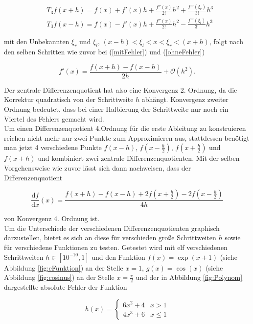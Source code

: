 \begin{align}
	&T_3f(x+h)= f(x) + f'(x)h +\frac{f''(x)}{2!}h^2 + \frac{f'''(\xi_r)}{3!}h^3
	\label{(x+h)}
	\\
	&T_3f(x-h)= f(x) - f'(x)h +\frac{f''(x)}{2!}h^2 - \frac{f'''(\xi_l)}{3!}h^3
	\label{(x-h)}
\end{align}

mit den Unbekannten $\xi_r$ und $\xi_l$, $(x-h) < \xi_l < x < \xi_r < (x+h)$, folgt nach den selben Schritten wie zuvor bei (\ref{mitFehler}) und (\ref{ohneFehler}) 

\begin{equation*}
	f'(x) = \frac{f(x+h)-f(x-h)}{2h} + \mathcal{O}(h^2).
\end{equation*}

Der zentrale Differenzenquotient hat also eine Konvergenz 2. Ordnung, da die Korrektur quadratisch von der Schrittweite $h$ abhängt. Konvergenz zweiter Ordnung bedeutet, dass bei einer Halbierung der Schrittweite nur noch ein Viertel des Fehlers gemacht wird.\\
Um einen Differenzenquotient 4.Ordnung für die erste Ableitung zu konstruieren reichen nicht mehr nur zwei Punkte zum Approximieren aus, stattdessen benötigt man jetzt 4 verschiedene Punkte $f(x-h)$, $f(x-\frac{h}{2})$, $f(x+\frac{h}{2})$ und $f(x+h)$ und kombiniert zwei zentrale Differenzenquotienten. Mit der selben Vorgehensweise wie zuvor lässt sich dann nachweisen, dass der Differenzenquotient

\begin{equation*}
	\frac{\mathrm{d}f}{\mathrm{d}x}(x) = \frac{f(x+h)-f(x-h)+2f(x+\frac{h}{2})-2f(x-\frac{h}{2})}{4h}
\end{equation*}

von Konvergenz 4. Ordnung ist.\\

Um die Unterschiede der verschiedenen Differenzenquotienten graphisch darzustellen, bietet es sich an diese für verschieden große Schrittweiten $h$ sowie für verschiedene Funktionen zu testen. Getestet wird mit elf verschiedenen Schrittweiten $h \in [10^{-10},1]$ und den Funktion $f(x) = \exp(x+1)$ (siehe Abbildung \ref{fig:eFunktion}) an der Stelle $x=1$, $g(x) = \cos(x)$ (siehe Abbildung \ref{fig:cosinus}) an der Stelle $ x = \frac{\pi}{2}$ und der in Abbildung \ref{fig:Polynom} dargestellte absolute Fehler der Funktion

\begin{equation}
	h(x)=
		 \begin{cases}
			6x^2+ 4 & x>1\\
			4x^3+6 & x\leq 1
		\end{cases}
	\label{polynom}
\end{equation}

